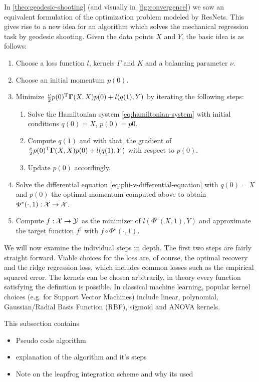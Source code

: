 In \cref{theo:geodesic-shooting} (and visually in \cref{fig:convergence}) we saw an equivalent formulation of the optimization problem modeled by ResNets.
This gives rise to a new idea for an algorithm which solves the mechanical regression task by geodesic shooting.
Given the data points $X$ and $Y$, the basic idea is as follows:
\begin{enumerate}[label=\arabic*.]
	\item Choose a loss function $l$, kernels $\Gamma$ and $K$ and a balancing parameter $\nu$.
	\item Choose an initial momentum $p(0)$.
	\item Minimize $\frac{\nu}{2} p(0)^{\mathrm{T}} \mathbf{\Gamma}(X, X)p(0) + l(q(1), Y)$ by iterating the following steps:
	\begin{enumerate}[label=\arabic*.]
		\item Solve the Hamiltonian system \ref{eq:hamiltonian-system} with initial conditions $q(0) = X$, $p(0) = p0$.
		\item Compute $q(1)$ and with that, the gradient of $\frac{\nu}{2} p(0)^{\mathrm{T}} \mathbf{\Gamma}(X, X)p(0) + l(q(1), Y)$ with respect to $p(0)$.
		\item Update $p(0)$ accordingly.
	\end{enumerate}
	\item Solve the differential equation \ref{eq:phi-v-differential-equation} with $q(0) = X$ and $p(0)$ the optimal momentum computed above to obtain $\Phi^v(\cdot, 1): \mathcal{X} \rightarrow \mathcal{X}$.
	\item Compute $f: \mathcal{X} \rightarrow \mathcal{Y}$ as the minimizer of $l(\Phi^v(X, 1), Y)$ and approximate the target function $f^\dagger$ with $f \circ \Phi^v(\cdot, 1)$.
\end{enumerate}

We will now examine the individual steps in depth.
The first two steps are fairly straight forward.
Viable choices for the loss are, of course, the optimal recovery and the ridge regression loss, which includes common losses such as the empirical squared error.
The kernels can be chosen arbitrarily, in theory every function satisfying the definition is possible.
In classical machine learning, popular kernel choices (e.g. for Support Vector Machines) include linear, polynomial, Gaussian/Radial Basis Function (RBF), sigmoid and ANOVA kernels.






This subsection contains
\begin{itemize}
	\item Pseudo code algorithm
	\item explanation of the algorithm and it's steps
	\item Note on the leapfrog integration scheme and why its used
\end{itemize}

